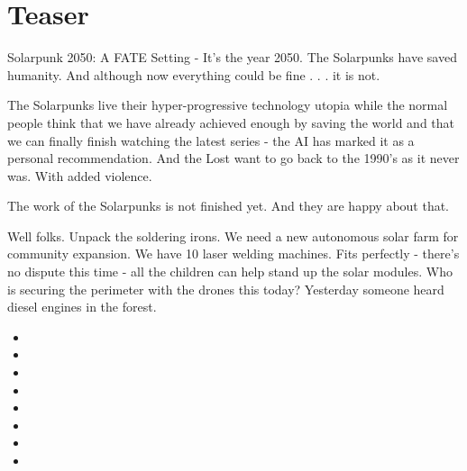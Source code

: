 \section{Teaser}

Solarpunk 2050: A FATE Setting - It's the year 2050. The Solarpunks have saved humanity. And although now everything could be fine . . . it is not.

The Solarpunks live their hyper-progressive technology utopia while the normal people think that we have already achieved enough by saving the world and that we can finally finish watching the latest series - the AI has marked it as a personal recommendation. And the Lost want to go back to the 1990's as it never was. With added violence.

The work of the Solarpunks is not finished yet. And they are happy about that.

\begin{solartalk}[title=Solarpunk Photovoltaik site]
    Well folks. Unpack the soldering irons. We need a new autonomous solar farm for community expansion.
    We have 10 laser welding machines. Fits perfectly - there's no dispute this time - all the children can help stand up the solar modules. Who is securing the perimeter with the drones this today? Yesterday someone heard diesel engines in the forest.
\end{solartalk}

\begin{solartalk}[title=Solarpunk Photovoltaik site - later]
    \begin{itemize}
        \item {}
        \item {}
        \item {}
        \item {}
        \item {}
        \item {}
        \item {}
        \item {}
    \end{itemize}
\end{solartalk}

